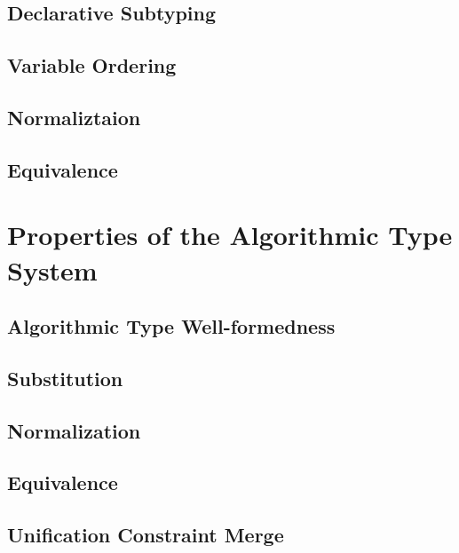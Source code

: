 \documentclass[a4,natbib=false]{article}
\begin{document}


\subsection{Declarative Subtyping}


\subsection{Variable Ordering}


\subsection{Normaliztaion}


\subsection{Equivalence}



\section{Properties of the Algorithmic Type System}

\subsection{Algorithmic Type Well-formedness}


\subsection{Substitution}


\subsection{Normalization}


\subsection{Equivalence}


\subsection{Unification Constraint Merge}

\end{document}
